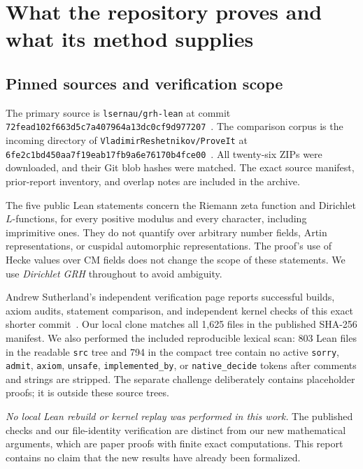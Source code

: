 \section{What the repository proves and what its method supplies}
\label{sec:source}

\subsection{Pinned sources and verification scope}

The primary source is \texttt{lsernau/grh-lean} at commit
\nolinkurl{72fead102f663d5c7a407964a13dc0cf9d977207}~\cite{repo}.
The comparison corpus is the incoming directory of
\texttt{VladimirReshetnikov/ProveIt} at
\nolinkurl{6fe2c1bd450aa7f19eab17fb9a6e76170b4fce00}~\cite{prior}.
All twenty-six ZIPs were downloaded, and their Git blob hashes were matched.
The exact source manifest, prior-report inventory, and overlap notes are
included in the archive.

The five public Lean statements concern the Riemann zeta function and
Dirichlet $L$-functions, for every positive modulus and every character,
including imprimitive ones. They do not quantify over arbitrary number
fields, Artin representations, or cuspidal automorphic representations.
The proof's use of Hecke values over CM fields does not change the scope of
these statements. We use \emph{Dirichlet GRH} throughout to avoid ambiguity.

Andrew Sutherland's independent verification page reports successful builds,
axiom audits, statement comparison, and independent kernel checks of this
exact shorter commit~\cite{verification}. Our local clone matches all
1,625 files in the published SHA-256 manifest. We also performed the
included reproducible lexical scan: 803 Lean files in the readable
\texttt{src} tree and 794 in the compact tree contain no active
\texttt{sorry}, \texttt{admit}, \texttt{axiom}, \texttt{unsafe},
\texttt{implemented\_by}, or \texttt{native\_decide} tokens after comments
and strings are stripped. The separate challenge deliberately contains
placeholder proofs; it is outside these source trees.

\emph{No local Lean rebuild or kernel replay was performed in this work.}
The published checks and our file-identity verification are distinct from
our new mathematical arguments, which are paper proofs with finite exact
computations. This report contains no claim that the new results have
already been formalized.

